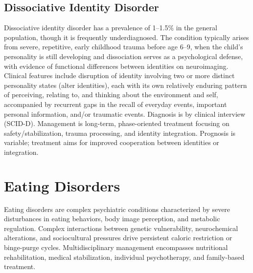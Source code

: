 \subsection{Dissociative Identity Disorder}
\label{sec:Dissociative Identity Disorder}
Dissociative identity disorder has a prevalence of 1--1.5\% in the general population, though it is frequently underdiagnosed. The condition typically arises from severe, repetitive, early childhood trauma before age 6--9, when the child's personality is still developing and dissociation serves as a psychological defense, with evidence of functional differences between identities on neuroimaging. Clinical features include disruption of identity involving two or more distinct personality states (alter identities), each with its own relatively enduring pattern of perceiving, relating to, and thinking about the environment and self, accompanied by recurrent gaps in the recall of everyday events, important personal information, and/or traumatic events. Diagnosis is by clinical interview (SCID-D). Management is long-term, phase-oriented treatment focusing on safety/stabilization, trauma processing, and identity integration. Prognosis is variable; treatment aims for improved cooperation between identities or integration.

\section{Eating Disorders}




Eating disorders are complex psychiatric conditions characterized by severe disturbances in eating behaviors, body image perception, and metabolic regulation. Complex interactions between genetic vulnerability, neurochemical alterations, and sociocultural pressures drive persistent caloric restriction or binge-purge cycles. Multidisciplinary management encompasses nutritional rehabilitation, medical stabilization, individual psychotherapy, and family-based treatment.


